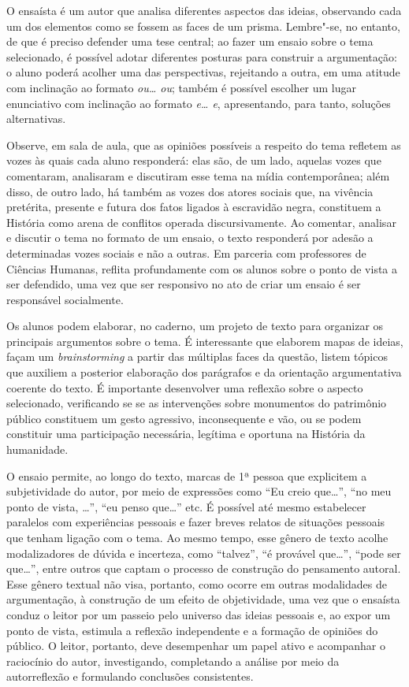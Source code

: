 \documentclass[12pt]{extarticle}
\begin{document}
O ensaísta é um autor que analisa diferentes aspectos das ideias,
observando cada um dos elementos como se fossem as faces de um prisma.
Lembre"-se, no entanto, de que é preciso defender uma tese central; ao
fazer um ensaio sobre o tema selecionado, é possível adotar diferentes
posturas para construir a argumentação: o aluno poderá acolher uma das
perspectivas, rejeitando a outra, em uma atitude com inclinação ao
formato \emph{ou\ldots{} ou}; também é possível escolher um lugar enunciativo
com inclinação ao formato \emph{e\ldots{} e}, apresentando, para tanto,
soluções alternativas.

Observe, em sala de aula, que as opiniões possíveis a respeito do tema
refletem as vozes às quais cada aluno responderá: elas são, de um lado,
aquelas vozes que comentaram, analisaram e discutiram esse tema na mídia
contemporânea; além disso, de outro lado, há também as vozes dos atores
sociais que, na vivência pretérita, presente e futura dos fatos ligados
à escravidão negra, constituem a História como arena de conflitos
operada discursivamente. Ao comentar, analisar e discutir o tema no
formato de um ensaio, o texto responderá por adesão a determinadas vozes
sociais e não a outras. Em parceria com professores de Ciências Humanas,
reflita profundamente com os alunos sobre o ponto de vista a ser
defendido, uma vez que ser responsivo no ato de criar um ensaio é ser
responsável socialmente.

Os alunos podem elaborar, no caderno, um projeto de texto para organizar
os principais argumentos sobre o tema. É interessante que elaborem mapas
de ideias, façam um \emph{brainstorming} a partir das múltiplas faces da
questão, listem tópicos que auxiliem a posterior elaboração dos
parágrafos e da orientação argumentativa coerente do texto. É importante
desenvolver uma reflexão sobre o aspecto selecionado, verificando se se
as intervenções sobre monumentos do patrimônio público constituem um
gesto agressivo, inconsequente e vão, ou se podem constituir uma
participação necessária, legítima e oportuna na História da humanidade.

O ensaio permite, ao longo do texto, marcas de 1ª pessoa que explicitem
a subjetividade do autor, por meio de expressões como ``Eu creio
que\ldots{}'', ``no meu ponto de vista, \ldots{}'', ``eu penso que\ldots{}'' etc. É
possível até mesmo estabelecer paralelos com experiências pessoais e
fazer breves relatos de situações pessoais que tenham ligação com o
tema. Ao mesmo tempo, esse gênero de texto acolhe modalizadores de
dúvida e incerteza, como ``talvez'', ``é provável que\ldots{}'', ``pode ser
que\ldots{}'', entre outros que captam o processo de construção do pensamento
autoral. Esse gênero textual não visa, portanto, como ocorre em outras
modalidades de argumentação, à construção de um efeito de objetividade,
uma vez que o ensaísta conduz o leitor por um passeio pelo universo das
ideias pessoais e, ao expor um ponto de vista, estimula a reflexão
independente e a formação de opiniões do público. O leitor, portanto,
deve desempenhar um papel ativo e acompanhar o raciocínio do autor,
investigando, completando a análise por meio da autorreflexão e
formulando conclusões consistentes.
\end{document}
